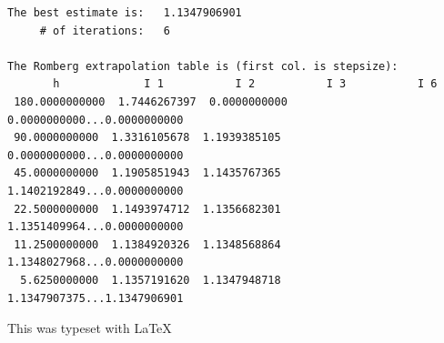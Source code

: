 \documentclass[titlepage,11pt]{article}
\begin{document}
\begin{singlespacing}
\begin{Verbatim}[frame=single]
The best estimate is:   1.1347906901
     # of iterations:   6

The Romberg extrapolation table is (first col. is stepsize):
       h             I 1           I 2           I 3           I 6
 180.0000000000  1.7446267397  0.0000000000 0.0000000000...0.0000000000
 90.0000000000  1.3316105678  1.1939385105  0.0000000000...0.0000000000
 45.0000000000  1.1905851943  1.1435767365  1.1402192849...0.0000000000
 22.5000000000  1.1493974712  1.1356682301  1.1351409964...0.0000000000
 11.2500000000  1.1384920326  1.1348568864  1.1348027968...0.0000000000
  5.6250000000  1.1357191620  1.1347948718  1.1347907375...1.1347906901

\end{Verbatim}
\end{singlespacing}
\noindent This was typeset with \LaTeX
\end{document}
